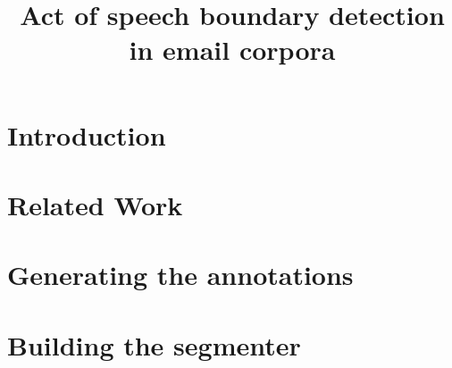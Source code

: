 \documentclass[11pt]{article}
\title{Act of speech boundary detection in email corpora}
\date{}
\begin{document}
\maketitle

\begin{abstract}

\end{abstract}

\section{Introduction}
\label{intro}

%
% 
\blfootnote{
    \hspace{-0.65cm}  %
}

\section{Related Work}

\section{Generating the annotations}

\section{Building the segmenter}
\end{document}
